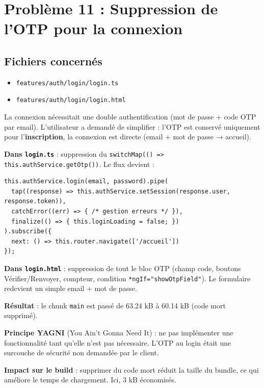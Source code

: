 \documentclass[a4paper,12pt,french]{article}
\begin{document}
\section{Problème 11 : Suppression de l'OTP pour la connexion}

\subsection{Fichiers concernés}
\begin{itemize}
    \item \texttt{features/auth/login/login.ts}
    \item \texttt{features/auth/login/login.html}
\end{itemize}

\begin{problembox}
La connexion nécessitait une double authentification (mot de passe + code OTP par email). L'utilisateur a demandé de simplifier : l'OTP est conservé uniquement pour l'\textbf{inscription}, la connexion est directe (email + mot de passe → accueil).
\end{problembox}

\begin{solutionbox}
\textbf{Dans \texttt{login.ts}} : suppression du \texttt{switchMap(() => this.authService.getOtp())}. Le flux devient :

\begin{lstlisting}[style=tsstyle]
this.authService.login(email, password).pipe(
  tap((response) => this.authService.setSession(response.user, response.token)),
  catchError((err) => { /* gestion erreurs */ }),
  finalize(() => { this.loginLoading = false; })
).subscribe({
  next: () => this.router.navigate(['/accueil'])
});
\end{lstlisting}

\textbf{Dans \texttt{login.html}} : suppression de tout le bloc OTP (champ code, boutons Vérifier/Renvoyer, compteur, condition \texttt{*ngIf="showOtpField"}). Le formulaire redevient un simple email + mot de passe.

\textbf{Résultat} : le chunk \texttt{main} est passé de 63.24 kB à 60.14 kB (code mort supprimé).
\end{solutionbox}

\begin{lessonbox}
\textbf{Principe YAGNI} (You Ain't Gonna Need It) : ne pas implémenter une fonctionnalité tant qu'elle n'est pas nécessaire. L'OTP au login était une surcouche de sécurité non demandée par le client.

\textbf{Impact sur le build} : supprimer du code mort réduit la taille du bundle, ce qui améliore le temps de chargement. Ici, 3 kB économisés.
\end{lessonbox}
\end{document}
